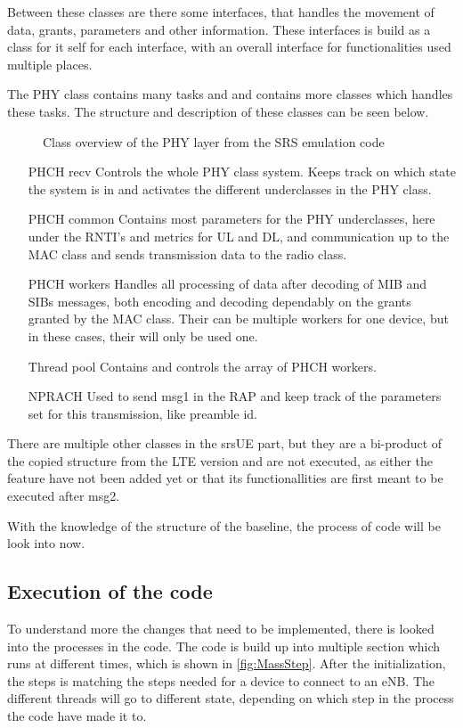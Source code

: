 Between these classes are there some interfaces, that handles the movement of data, grants, parameters and other information. These interfaces is build as a class for it self for each interface, with an overall interface for functionalities used multiple places. 

The PHY class contains many tasks and and contains more classes which handles these tasks. The structure and description of these classes can be seen below.

\begin{figure}[H]
\centering
{}
\resizebox{0.5\textwidth}{!}{
}
\caption{Class overview of the PHY layer from the SRS emulation code}
\label{fig:PhyClass}
\end{figure}

\begin{itemize}
\item [PHCH recv] Controls the whole PHY class system. Keeps track on which state the system is in and activates the different underclasses in the PHY class.
\item [PHCH common] Contains most parameters for the PHY underclasses, here under the RNTI's and metrics for UL and DL, and communication up to the MAC class and sends transmission data to the radio class.
\item [PHCH workers] Handles all processing of data after decoding of MIB and SIBs messages, both encoding and decoding dependably on the grants granted by the MAC class. Their can be multiple workers for one device, but in these cases, their will only be used one.
\item [Thread pool] Contains and controls the array of PHCH workers.	
\item [NPRACH] Used to send msg1 in the RAP and keep track of the parameters set for this transmission, like preamble id.
\end{itemize}

There are multiple other classes in the srsUE part, but they are a bi-product of the copied structure from the LTE version and are not executed, as either the feature have not been added yet or that its functionallities are first meant to be executed after msg2.

With the knowledge of the structure of the baseline, the process of code will be look into now.


\subsection{Execution of the code}
To understand more the changes that need to be implemented, there is looked into the processes in the code. The code is build up into multiple section which runs at different times, which is shown in \autoref{fig:MassStep}. After the initialization, the steps is matching the steps needed for a device to connect to an eNB. The different threads will go to different state, depending on which step in the process the code have made it to.

